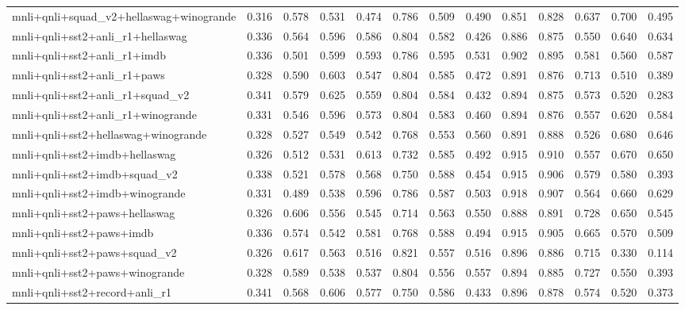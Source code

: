 \begin{table}[t]
\begin{tabular}{lrrrrrrrrrrrr}
    mnli+qnli+squad\_v2+hellaswag+winogrande & 0.316 & 0.578 & 0.531 & 0.474 & 0.786 & 0.509 & 0.490 & 0.851 & 0.828 & 0.637 & 0.700 & 0.495 \\
    mnli+qnli+sst2+anli\_r1+hellaswag & 0.336 & 0.564 & 0.596 & 0.586 & 0.804 & 0.582 & 0.426 & 0.886 & 0.875 & 0.550 & 0.640 & 0.634 \\
    mnli+qnli+sst2+anli\_r1+imdb & 0.336 & 0.501 & 0.599 & 0.593 & 0.786 & 0.595 & 0.531 & 0.902 & 0.895 & 0.581 & 0.560 & 0.587 \\
    mnli+qnli+sst2+anli\_r1+paws & 0.328 & 0.590 & 0.603 & 0.547 & 0.804 & 0.585 & 0.472 & 0.891 & 0.876 & 0.713 & 0.510 & 0.389 \\
    mnli+qnli+sst2+anli\_r1+squad\_v2 & 0.341 & 0.579 & 0.625 & 0.559 & 0.804 & 0.584 & 0.432 & 0.894 & 0.875 & 0.573 & 0.520 & 0.283 \\
    mnli+qnli+sst2+anli\_r1+winogrande & 0.331 & 0.546 & 0.596 & 0.573 & 0.804 & 0.583 & 0.460 & 0.894 & 0.876 & 0.557 & 0.620 & 0.584 \\
    mnli+qnli+sst2+hellaswag+winogrande & 0.328 & 0.527 & 0.549 & 0.542 & 0.768 & 0.553 & 0.560 & 0.891 & 0.888 & 0.526 & 0.680 & 0.646 \\
    mnli+qnli+sst2+imdb+hellaswag & 0.326 & 0.512 & 0.531 & 0.613 & 0.732 & 0.585 & 0.492 & 0.915 & 0.910 & 0.557 & 0.670 & 0.650 \\
    mnli+qnli+sst2+imdb+squad\_v2 & 0.338 & 0.521 & 0.578 & 0.568 & 0.750 & 0.588 & 0.454 & 0.915 & 0.906 & 0.579 & 0.580 & 0.393 \\
    mnli+qnli+sst2+imdb+winogrande & 0.331 & 0.489 & 0.538 & 0.596 & 0.786 & 0.587 & 0.503 & 0.918 & 0.907 & 0.564 & 0.660 & 0.629 \\
    mnli+qnli+sst2+paws+hellaswag & 0.326 & 0.606 & 0.556 & 0.545 & 0.714 & 0.563 & 0.550 & 0.888 & 0.891 & 0.728 & 0.650 & 0.545 \\
    mnli+qnli+sst2+paws+imdb & 0.336 & 0.574 & 0.542 & 0.581 & 0.768 & 0.588 & 0.494 & 0.915 & 0.905 & 0.665 & 0.570 & 0.509 \\
    mnli+qnli+sst2+paws+squad\_v2 & 0.326 & 0.617 & 0.563 & 0.516 & 0.821 & 0.557 & 0.516 & 0.896 & 0.886 & 0.715 & 0.330 & 0.114 \\
    mnli+qnli+sst2+paws+winogrande & 0.328 & 0.589 & 0.538 & 0.537 & 0.804 & 0.556 & 0.557 & 0.894 & 0.885 & 0.727 & 0.550 & 0.393 \\
    mnli+qnli+sst2+record+anli\_r1 & 0.341 & 0.568 & 0.606 & 0.577 & 0.750 & 0.586 & 0.433 & 0.896 & 0.878 & 0.574 & 0.520 & 0.373 \\

\end{tabular}
\end{table}

